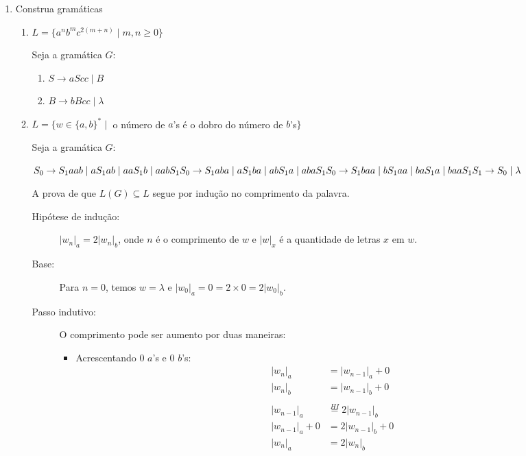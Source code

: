 \documentclass[brazil, a4paper,12pt]{article}
\begin{document}
\begin{enumerate}

\item Construa gramáticas
  \begin{enumerate}
    \item $L = \{a^nb^mc^{2(m+n)} \mid m, n \geq 0\}$

    Seja a gramática $G$:

    \begin{enumerate}
      \item $S \rightarrow aScc \mid B$
      \item $B \rightarrow bBcc \mid \lambda$
    \end{enumerate}

    \item $L = \{w \in \{a,b\}^* \mid$ o número de $a$'s é o dobro do número de
    $b$'s$\}$

    Seja a gramática $G$:

    $S_0 \rightarrow S_1aab \mid aS_1ab \mid aaS_1b \mid aabS_1 \\
     S_0 \rightarrow S_1aba \mid aS_1ba \mid abS_1a \mid abaS_1 \\
     S_0 \rightarrow S_1baa \mid bS_1aa \mid baS_1a \mid baaS_1 \\
     S_1 \rightarrow S_0 \mid \lambda$

    A prova de que $L(G) \subseteq L$ segue por indução no comprimento da palavra.

    \begin{description}
      \item[Hipótese de indução:] $|w_n|_a = 2|w_n|_b$, onde $n$ é o comprimento de
    $w$ e $|w|_x$ é a quantidade de letras $x$ em $w$.

      \item[Base:] Para $n = 0$, temos $w = \lambda$ e $|w_0|_a = 0 = 2 \times 0 =
    2|w_0|_b$.

      \item[Passo indutivo:] O comprimento pode ser aumento por duas maneiras:
      \begin{itemize}
        \item Acrescentando 0 $a$'s e 0 $b$'s:
          \begin{align*}
            |w_n|_a &= |w_{n-1}|_a + 0 \\
            |w_n|_b &= |w_{n-1}|_b + 0 \\
            \\
            |w_{n-1}|_a &\overset{HI}{=} 2|w_{n-1}|_b \\
            |w_{n-1}|_a + 0 &= 2|w_{n-1}|_b + 0 \\
            |w_n|_a &= 2|w_n|_b
          \end{align*}


\end{itemize}
\end{description}
\end{enumerate}
\end{enumerate}
\end{document}
